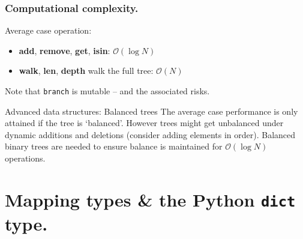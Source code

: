\documentclass{beamer} %
\newcommand\emc[1]{\textcolor{brightblue}{\textbf{#1}}}
\begin{document}
\begin{frame}
\frametitle{Computational complexity.}

Average case operation:
\begin{itemize}
  \item \emc{add}, \emc{remove}, \emc{get}, \emc{isin}: $\mathcal{O}(\log N)$
  \item \emc{walk}, \emc{len}, \emc{depth} walk the full tree: $\mathcal{O}(N)$
\end{itemize}
Note that \texttt{branch} is mutable -- and the associated risks.

\vspace{3mm}
\begin{block}{Advanced data structures: Balanced trees}
The average case performance is only attained if the tree is `balanced'. However trees might get unbalanced under dynamic additions and deletions (consider adding elements in order). Balanced binary trees are needed to ensure balance is maintained for $\mathcal{O}(\log N)$ operations.
\end{block}

\end{frame}

\section{Mapping types \& the Python \texttt{dict} type.}

\end{document}
